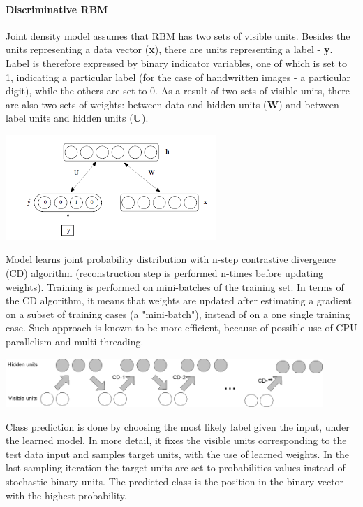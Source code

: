 \documentclass[a4paper]{scrartcl}
\begin{document}
\paragraph{Discriminative RBM}
Joint density model assumes that RBM has two sets of visible units. Besides the units representing a data vector ({\bfseries x}), there are units representing a label - {\bfseries y}. Label is therefore expressed by binary indicator variables, one of which is set to 1, indicating a particular label (for the case of handwritten images - a particular digit), while the others are set to 0. 
As a result of two sets of visible units, there are also two sets of weights: between data and hidden units ({\bfseries W}) and between label units and hidden units ({\bfseries U}). 
\begin{center}
\includegraphics[width=8cm]{images/jointProbModel2.png}
\end{center}
Model learns joint probability distribution with n-step contrastive divergence (CD) algorithm (reconstruction step is performed n-times before updating weights). Training is performed on mini-batches of the training set. In terms of the CD algorithm, it means that weights are updated after estimating a gradient on a subset of training cases (a "mini-batch"), instead of on a one single training case. Such approach is known to be more efficient, because of possible use of CPU parallelism and multi-threading.
\begin{center}
\includegraphics[width=12cm]{images/cd-n.png}
\end{center} 
\par Class prediction is done by choosing the most likely label given the input, under the learned model. In more detail, it fixes the visible units corresponding to the test data input and samples target units, with the use of learned weights. In the last sampling iteration the target units are set to probabilities values instead of stochastic binary units. The predicted class is the position in the binary vector with the highest probability. 
\end{document}
